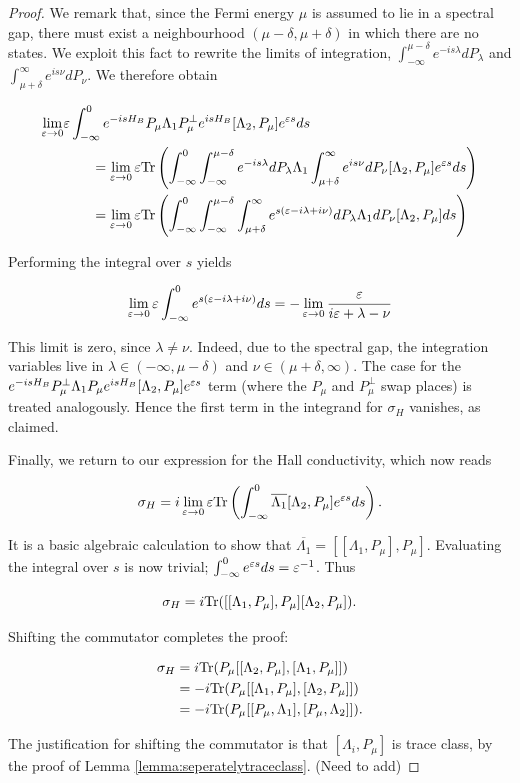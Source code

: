 \documentclass[12pt, letterpaper]{article}
\begin{document}
\begin{proof}
We remark that, since the Fermi energy $\mu$ is assumed to lie in a spectral gap, there must exist a neighbourhood $(\mu-\delta, \mu+\delta)$ in which there are no states. We exploit this fact to rewrite the limits of integration, $\int_{-\infty}^{\mu-\delta} e^{-is\lambda}dP_\lambda$ and $\int_{\mu+\delta}^\infty e^{is\nu} dP_\nu$. We therefore obtain

\[\begin{aligned} 
\lim_{\varepsilon\to 0} &\varepsilon \int_{-\infty}^0 e^{-isH_B}P_\mu \Lambda_1 P_\mu^\perp e^{isH_B}[\Lambda_2, P_\mu]e^{\varepsilon s} ds \\
&\quad\quad= \lim_{\varepsilon\to 0} \varepsilon \text{Tr}\left( \int_{-\infty}^0 \int_{-\infty}^{\mu-\delta} e^{-is\lambda}dP_\lambda \Lambda_1 \int_{\mu+\delta}^\infty e^{is\nu} dP_\nu [\Lambda_2, P_\mu] e^{\varepsilon s} ds\right)\\
&\quad\quad= \lim_{\varepsilon\to 0} \varepsilon \text{Tr}\left( \int_{-\infty}^0 \int_{-\infty}^{\mu-\delta} \int_{\mu+\delta}^\infty e^{s(\varepsilon-i\lambda+i\nu)}dP_\lambda \Lambda_1 dP_\nu [\Lambda_2, P_\mu]ds\right)\\
\end{aligned}\]

Performing the integral over $s$ yields

\[\lim_{\varepsilon\to 0}\varepsilon \int_{-\infty}^0 e^{s(\varepsilon-i\lambda+i\nu)}ds = -\lim_{\varepsilon\to 0} \frac{\varepsilon}{i\varepsilon + \lambda-\nu}\]

This limit is zero, since $\lambda \neq \nu$. Indeed, due to the spectral gap, the integration variables live in $\lambda \in (-\infty, \mu-\delta)$ and $\nu \in (\mu+\delta,\infty)$. The case for the $e^{-isH_B}P_\mu^\perp \Lambda_1 P_\mu e^{isH_B}[\Lambda_2, P_\mu]e^{\varepsilon s}$ term (where the $P_\mu$ and $P_\mu^\perp$ swap places) is treated analogously. Hence the first term in the integrand for $\sigma_H$ vanishes, as claimed. 

Finally, we return to our expression for the Hall conductivity, which now reads

\[\sigma_H = i\lim_{\varepsilon\to 0}\varepsilon \text{Tr}\left(\int_{-\infty}^0 \overline{\Lambda_1}[\Lambda_2, P_\mu]e^{\varepsilon s}ds\right).\]

It is a basic algebraic calculation to show that $\overline{\Lambda_1} = [[\Lambda_1, P_\mu],P_\mu]$. Evaluating the integral over $s$ is now trivial; $\int_{-\infty}^0 e^{\varepsilon s}ds = \varepsilon^{-1}$. Thus

\[\sigma_H = i\text{Tr}([[\Lambda_1,P_\mu],P_\mu][\Lambda_2,P_\mu]).\]

Shifting the commutator completes the proof:

\[\begin{aligned}
\sigma_H &= i\text{Tr}(P_\mu[[\Lambda_2,P_\mu],[\Lambda_1,P_\mu]]) \\
&= -i\text{Tr}(P_\mu[[\Lambda_1,P_\mu],[\Lambda_2,P_\mu]])\\
&= -i\text{Tr}(P_\mu[[P_\mu,\Lambda_1],[P_\mu,\Lambda_2]]).
\end{aligned}\]

The justification for shifting the commutator is that $[\Lambda_i,P_\mu]$ is trace class, by the proof of Lemma \ref{lemma:seperatelytraceclass}. (Need to add)
\end{proof}
\end{document}
